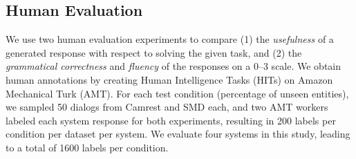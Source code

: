 \subsection{Human Evaluation}
We use two human evaluation experiments to compare (1) the \emph{usefulness} of a generated response with respect to solving the given task, and (2) the \emph{grammatical correctness} and \emph{fluency} of the responses on a 0--3 scale. We obtain human annotations by creating Human Intelligence Tasks (HITs) on Amazon Mechanical Turk (AMT). For each test condition (percentage of unseen entities), we sampled 50 dialogs from Camrest and SMD each, and two AMT workers labeled each system response for both experiments, resulting in 200 labels per condition per dataset per system. We evaluate four systems in this study, leading to a total of 1600 labels per condition. 


